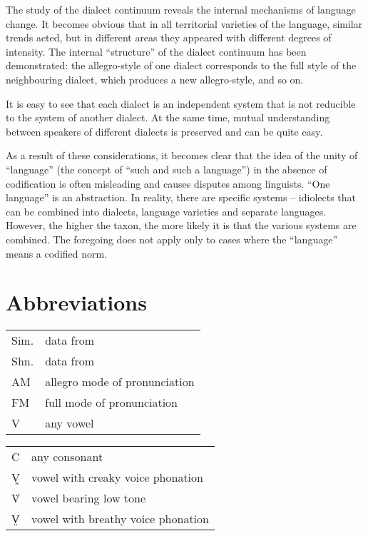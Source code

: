 \documentclass[output=paper,colorlinks,citecolor=brown]{langscibook}
\begin{document}
The study of the  dialect continuum reveals the internal mechanisms of language change. It becomes obvious that in all territorial varieties of the  language, similar trends acted, but in different areas they appeared with different degrees of intensity. The internal “structure” of the dialect continuum has been demonstrated: the allegro-style of one dialect corresponds to the full style of the neighbouring dialect, which produces a new allegro-style, and so on.

It is easy to see that each dialect is an independent system that is not reducible to the system of another dialect. At the same time, mutual understanding between speakers of different dialects is preserved and can be quite easy.

As a result of these considerations, it becomes clear that the idea of the unity of “language” (the concept of “such and such a language”) in the absence of codification is often misleading and causes disputes among linguists. “One language” is an abstraction. In reality, there are specific systems – idiolects that can be combined into dialects, language varieties and separate languages. However, the higher the taxon, the more likely it is that the various systems are combined. The foregoing does not apply only to cases where the “language” means a codified norm.\largerpage[2]


\section*{Abbreviations}

\begin{tabularx}{.55\textwidth}{@{}lQ}
Sim. & data from \citet{SimonovKialundziuga1998}\\
Shn. & data from \citet{Shneider1936}\\
AM & allegro mode of pronunciation\\
FM & full mode of pronunciation\\
V & any vowel\\
\end{tabularx}\begin{tabularx}{.45\textwidth}{lQ@{}}
C & any consonant\\
V̰ & vowel with creaky voice phonation\\
V̀ & vowel bearing low tone\\
V̤ & vowel with breathy voice phonation\\
\end{tabularx}
\end{document}
